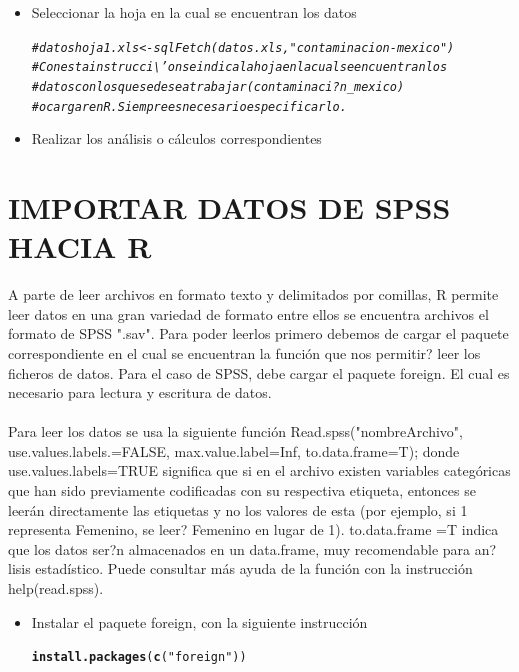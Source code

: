 \documentclass[12pt,letterpaper]{article}\usepackage[]{graphicx}\usepackage[]{color}
\makeatletter
\newcommand{\hlstr}[1]{\textcolor[rgb]{0.192,0.494,0.8}{#1}}%
\newcommand{\hlcom}[1]{\textcolor[rgb]{0.678,0.584,0.686}{\textit{#1}}}%
\newcommand{\hlstd}[1]{\textcolor[rgb]{0.345,0.345,0.345}{#1}}%
\newcommand{\hlkwd}[1]{\textcolor[rgb]{0.737,0.353,0.396}{\textbf{#1}}}%
\newenvironment{kframe}{%
 \def\at@end@of@kframe{}%
 \ifinner\ifhmode%
  \def\at@end@of@kframe{\end{minipage}}%
  \begin{minipage}{\columnwidth}%
 \fi\fi%
 \def\FrameCommand##1{\hskip\@totalleftmargin \hskip-\fboxsep
 \colorbox{shadecolor}{##1}\hskip-\fboxsep
     \hskip-\linewidth \hskip-\@totalleftmargin \hskip\columnwidth}%
 \MakeFramed {\advance\hsize-\width
   \@totalleftmargin\z@ \linewidth\hsize
   \@setminipage}}%
 {\par\unskip\endMakeFramed%
 \at@end@of@kframe}
\newenvironment{knitrout}{}{} %
\makeatother
\begin{document}
\begin{itemize}
\begin{itemize}
\begin{knitrout}
\begin{kframe}
{\ttfamily\noindent\bfseries\color{errorcolor}{\#\# Error in odbcConnectExcel(file.choose()): odbcConnectExcel is only usable with 32-bit Windows}}\end{kframe}
\end{knitrout}
\item Seleccionar la hoja en la cual se encuentran los datos 
\begin{knitrout}
\color{fgcolor}\begin{kframe}
\begin{alltt}
\hlcom{# datoshoja1.xls <- sqlFetch(datos.xls,"contaminacion-mexico")}
\hlcom{# Con esta instrucci\textbackslash{}'on se indica la hoja en la cual se encuentran los }
\hlcom{# datos con los que se desea trabajar (contaminaci?n_mexico) }
\hlcom{# o cargar en R. Siempre es necesario especificarlo.}
\end{alltt}
\end{kframe}
\end{knitrout}
\item Realizar los an\'alisis o c\'alculos correspondientes
\end{itemize}

\newpage
\section{IMPORTAR DATOS DE SPSS HACIA R}
A parte de leer archivos en formato texto y delimitados por comillas, R permite leer datos en una gran variedad de formato entre ellos se encuentra archivos el formato de SPSS ".sav". Para poder leerlos primero debemos de cargar el paquete correspondiente en el cual se encuentran la funci\'on que nos permitir? leer los ficheros de datos. Para el caso de SPSS, debe cargar el paquete foreign. El cual es necesario para lectura y escritura de datos.\\\\
Para leer los datos se usa la siguiente funci\'on Read.spss("nombreArchivo", use.values.labels.=FALSE, max.value.label=Inf, to.data.frame=T); donde use.values.labels=TRUE significa que si en el archivo existen variables categ\'oricas que han sido previamente codificadas con su respectiva etiqueta, entonces se leer\'an directamente las etiquetas y no los valores de esta (por ejemplo, si 1 representa Femenino, se leer? Femenino en lugar de 1). to.data.frame =T indica que los datos ser?n almacenados en un data.frame, muy recomendable para an?lisis estad\'istico. Puede consultar m\'as ayuda de la funci\'on con la instrucci\'on help(read.spss).
\begin{itemize}
\item Instalar el paquete foreign, con la siguiente instrucci\'on 
\begin{knitrout}
\color{fgcolor}\begin{kframe}
\begin{alltt}
\hlkwd{install.packages}\hlstd{(}\hlkwd{c}\hlstd{(}\hlstr{"foreign"}\hlstd{))}
\end{alltt}



\end{kframe}
\end{knitrout}
\end{itemize}
\end{itemize}
\end{document}
